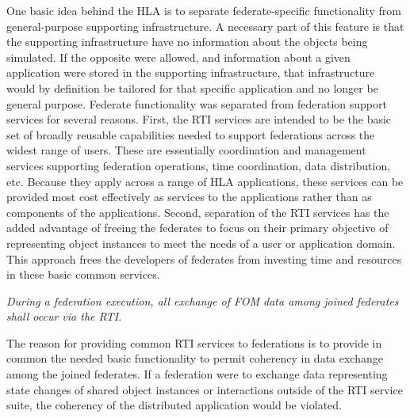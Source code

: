 \vspace{6.1pt}
One basic idea behind the HLA is to separate federate-specific functionality from general-purpose\linebreak
supporting infrastructure. A necessary part of this feature is that the supporting infrastructure have no\linebreak
information about the objects being simulated. If the opposite were allowed, and information about a given\linebreak
application were stored in the supporting infrastructure, that infrastructure would by definition be tailored\linebreak
for that specific application and no longer be general purpose. Federate functionality was separated from\linebreak
federation support services for several reasons. First, the RTI services are intended to be the basic set of\linebreak
broadly reusable capabilities needed to support federations across the widest range of users. These are\linebreak
essentially coordination and management services supporting federation operations, time coordination, data\linebreak
distribution, etc. Because they apply across a range of HLA applications, these services can be provided\linebreak
most cost effectively as services to the applications rather than as components of the applications. Second,\linebreak
separation of the RTI services has the added advantage of freeing the federates to focus on their primary\linebreak
objective of representing object instances to meet the needs of a user or application domain. This approach\linebreak
frees the developers of federates from investing time and resources in these basic common services.

\vspace{4.6pt}

\textit{During a federation execution, all exchange of FOM data among joined federates shall occur via the RTI.}

\vspace{6.1pt}
The reason for providing common RTI services to federations is to provide in common the needed basic\linebreak
functionality to permit coherency in data exchange among the joined federates. If a federation were to\linebreak
exchange data representing state changes of shared object instances or interactions outside of the RTI service\linebreak
suite, the coherency of the distributed application would be violated.

